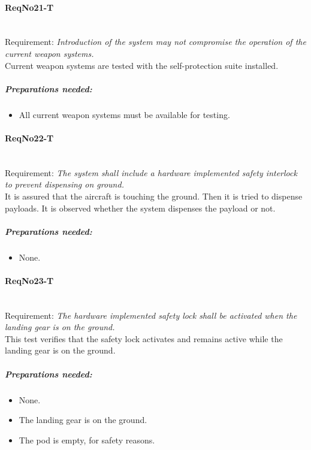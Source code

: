 \paragraph{ReqNo21-T}\mbox{}\\ %
Requirement: \textit{Introduction of the system may not compromise the operation of the current weapon systems.}
\\
Current weapon systems are tested with the self-protection suite installed.

	\subparagraph{Preparations needed:}
	\begin{itemize}
	\item All current weapon systems must be available for testing.
	\end{itemize} 
	

\paragraph{ReqNo22-T}\mbox{}\\ %
Requirement: \textit{The system shall include a hardware implemented safety interlock to prevent dispensing on ground.}
\\
It is assured that the aircraft is touching the ground. Then it is tried to dispense payloads. It is observed whether the system dispenses the payload or not.
\\
	\subparagraph{Preparations needed:}
	\begin{itemize}
	\item None.
	\end{itemize} 

\paragraph{ReqNo23-T}\mbox{}\\ %
Requirement: \textit{The hardware implemented safety lock shall be activated when the landing gear is on the ground.}
\\
This test verifies that the safety lock activates and remains active while the
landing gear is on the ground.
\\
	\subparagraph{Preparations needed:}
	\begin{itemize}
	\item None.
	\item The landing gear is on the ground.
	\item The pod is empty, for safety reasons.
	\end{itemize}

